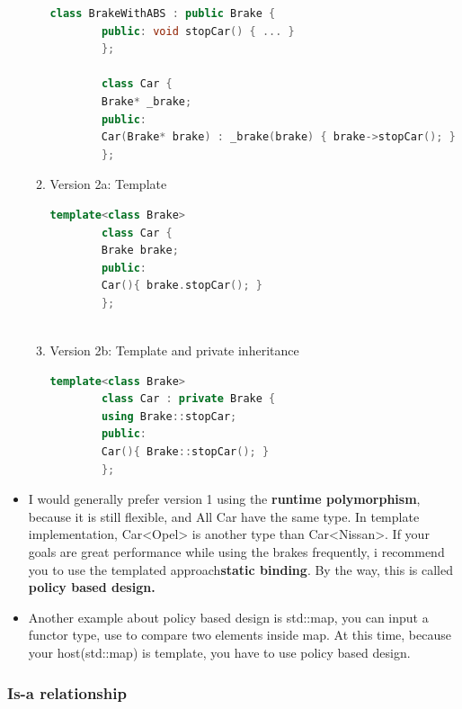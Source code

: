 \documentclass[a4paper,12pt,twoside]{book}
\begin{document}
\begin{itemize}
\begin{enumerate}
\begin{lstlisting}[frame=single, language=c++]
		class BrakeWithABS : public Brake {
		public: void stopCar() { ... }
		};
		
		class Car {
		Brake* _brake;
		public:
		Car(Brake* brake) : _brake(brake) { brake->stopCar(); }
		};
		\end{lstlisting}
		
		\item Version 2a: Template
		
		\begin{lstlisting}[frame=single, language=c++]
		template<class Brake>
		class Car {
		Brake brake;
		public:
		Car(){ brake.stopCar(); }
		};
		
		\end{lstlisting}
		\item Version 2b: Template and private inheritance
		\begin{lstlisting}[frame=single, language=c++]
		template<class Brake>
		class Car : private Brake {
		using Brake::stopCar;
		public:
		Car(){ Brake::stopCar(); }
		};
		\end{lstlisting}
	\end{enumerate}
	
	\item I would generally prefer version 1 using the \textbf{runtime polymorphism}, because it is still flexible, and All Car  have the same type. In template implementation,  Car<Opel> is another type than Car<Nissan>. If your goals are great performance while using the brakes frequently, i recommend you to use the templated approach\textbf{static binding}. By the way, this is called \textbf{policy based design.}
	
	\item Another example about policy based design is std::map, you can input a functor type, use to compare two elements inside map. At this time, because your host(std::map) is template, you have to use policy based design.
\end{itemize}

\subsubsection{Is-a relationship}
\end{document}
